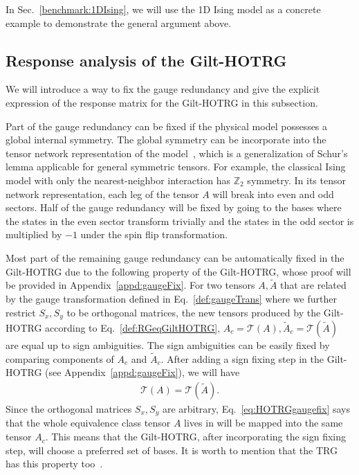 \documentclass[aps,prb,reprint,superscriptaddress,floatfix]{revtex4-2}
\begin{document}
In Sec.~\ref{benchmark:1DIsing}, we will use the 1D Ising model as a
concrete example to demonstrate the general argument above.
%

\subsection{Response analysis of the Gilt-HOTRG\label{RespAnaGiltHOTRG}}
We will introduce a way to fix the gauge redundancy and give the
explicit expression of the response matrix for the Gilt-HOTRG in this
subsection.
%

Part of the gauge redundancy can be fixed if the physical model
possesses a global internal symmetry. The global symmetry can be
incorporate into the tensor network representation of the
model~\cite{Singh2010SymTen,Singh2011U1Ten,Singh2012SU2Ten}, which is a
generalization of Schur's lemma applicable for general symmetric
tensors. For example, the classical Ising model with only the
nearest-neighbor interaction has $\mathbb{Z}_2$ symmetry. In its tensor
network representation, each leg of the tensor $A$ will break into even
and odd sectors. Half of the gauge redundancy will be fixed by going to
the bases where the states in the even sector transform trivially and
the states in the odd sector is multiplied by $-1$ under the spin flip
transformation.
%

Most part of the remaining gauge redundancy can be automatically fixed
in the Gilt-HOTRG due to the following property of the Gilt-HOTRG, whose
proof will be provided in Appendix~\ref{appd:gaugeFix}. For two tensors
$A, \tilde{A}$ that are related by the gauge transformation defined in
Eq.~\eqref{def:gaugeTrans} where we further restrict $S_x,S_y$ to be
orthogonal matrices, 
the new tensors produced by the Gilt-HOTRG according to
Eq.~\eqref{def:RGeqGiltHOTRG}, $A_c = \mathcal{T}\left(A\right),
\tilde{A}_c = \mathcal{T}(\tilde{A})$ are equal up to sign ambiguities.
The sign ambiguities can be easily fixed by comparing components of
$A_c$ and $\tilde{A}_c$. After adding a sign fixing step in the
Gilt-HOTRG (see Appendix~\ref{appd:gaugeFix}),
we will have
%
\begin{align}\label{eq:HOTRGgaugefix}
    \mathcal{T}(A) = \mathcal{T}(\tilde{A}).
\end{align}
%
Since the orthogonal matrices $S_x, S_y$ are arbitrary,
Eq.~\eqref{eq:HOTRGgaugefix} says that the whole equivalence class tensor
$A$ lives in will be mapped into the same tensor $A_c$. This means
that the Gilt-HOTRG, after incorporating the sign fixing step, will choose a
preferred set of bases. It is worth to mention that the TRG has this
property too~\cite{kadanoff2014}.
%
\end{document}
